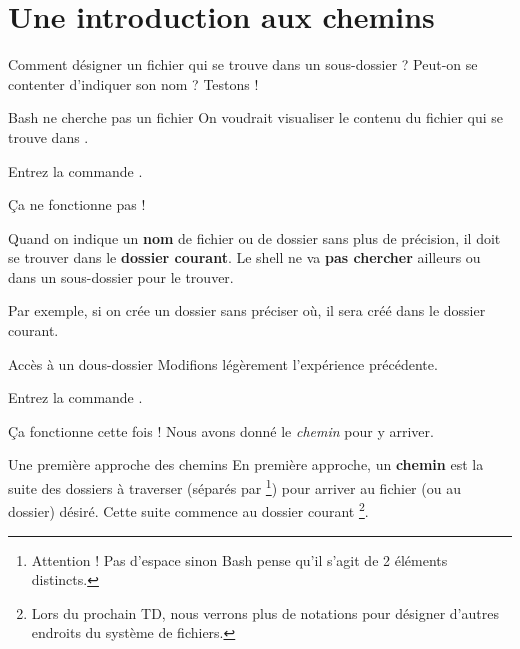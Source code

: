 \documentclass[a4paper,11pt]{style-esi/td}
\begin{document}
	\section{Une introduction aux chemins}

		Comment désigner un fichier qui se trouve dans un sous-dossier ?
		Peut-on se contenter d'indiquer son nom ? Testons !

		\begin{Experience}{Bash ne cherche pas un fichier}
			On voudrait visualiser le contenu du fichier 
			qui se trouve dans .
			\begin{steps}
			\item 
				Entrez la commande .
			\end{steps}
			\c Ca ne fonctionne pas !
		\end{Experience}

		\begin{alertbox}
			Quand on indique un \textbf{nom} de fichier ou de dossier sans plus de précision,
			il doit se trouver dans le \textbf{dossier courant}.
			Le shell ne va \textbf{pas chercher} ailleurs ou dans un sous-dossier 
			pour le trouver. 
		\end{alertbox}

		Par exemple, si on crée un dossier sans préciser où,
		il sera créé dans le dossier courant.

		\begin{Experience}{Accès à un dous-dossier}
			Modifions légèrement l'expérience précédente.
			\begin{steps}
			\item 
				Entrez la commande \kbd{cat dev1/readme}.
			\end{steps}
			\c Ca fonctionne cette fois !
			Nous avons donné le \emph{chemin} pour y arriver.
		\end{Experience}

		\begin{theorie}{Une première approche des chemins}
			En première approche, un \textbf{chemin}
			est la suite des dossiers à traverser 
			(séparés par \samp{/}%
			\footnote{%
				Attention ! Pas d'espace sinon Bash pense 
				qu'il s'agit de 2 éléments distincts.
			})
			pour arriver au fichier
			(ou au dossier) désiré.
			Cette suite commence au dossier courant%
			\footnote{%
				Lors du prochain TD, 
				nous verrons plus de notations pour désigner 
				d'autres endroits du système de fichiers.
			}.
		\end{theorie}
\end{document}
